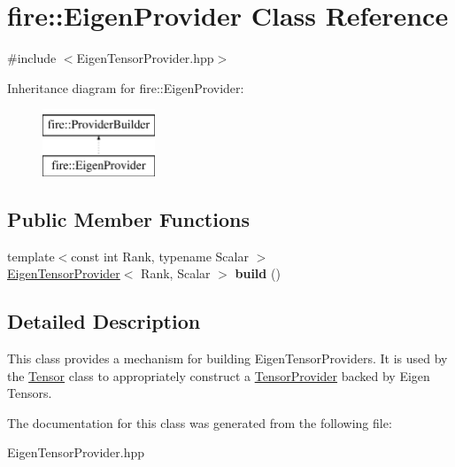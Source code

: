 \hypertarget{a00013}{}\section{fire\+:\+:Eigen\+Provider Class Reference}
\label{a00013}


{\ttfamily \#include $<$Eigen\+Tensor\+Provider.\+hpp$>$}

Inheritance diagram for fire\+:\+:Eigen\+Provider\+:\begin{figure}[H]
\begin{center}
\leavevmode
\includegraphics[height=2.000000cm]{a00013}
\end{center}
\end{figure}
\subsection*{Public Member Functions}
\begin{DoxyCompactItemize}
\item 
\hypertarget{a00013_ab9bfc7a0004ea10d57442f495c468b2e}{}{\footnotesize template$<$const int Rank, typename Scalar $>$ }\\\hyperlink{a00014}{Eigen\+Tensor\+Provider}$<$ Rank, Scalar $>$ {\bfseries build} ()\label{a00013_ab9bfc7a0004ea10d57442f495c468b2e}

\end{DoxyCompactItemize}


\subsection{Detailed Description}
This class provides a mechanism for building Eigen\+Tensor\+Providers. It is used by the \hyperlink{a00046}{Tensor} class to appropriately construct a \hyperlink{a00047}{Tensor\+Provider} backed by Eigen Tensors. 

The documentation for this class was generated from the following file\+:\begin{DoxyCompactItemize}
\item 
Eigen\+Tensor\+Provider.\+hpp\end{DoxyCompactItemize}
